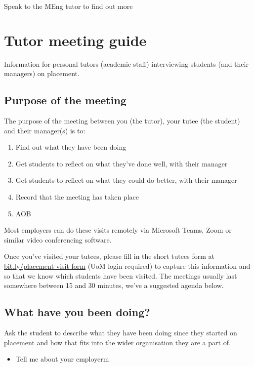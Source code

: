 \documentclass[
]{book}
\providecommand{\tightlist}{%
  \setlength{\itemsep}{0pt}\setlength{\parskip}{0pt}}
\begin{document}
Speak to the MEng tutor to find out more

\chapter{Tutor meeting guide}\label{tutors}

Information for personal tutors (academic staff) interviewing students (and their managers) on placement.

\section{Purpose of the meeting}\label{purpose}

The purpose of the meeting between you (the tutor), your tutee (the student) and their manager(s) is to:

\begin{enumerate}
\def\labelenumi{\arabic{enumi}.}
\tightlist
\item
  Find out what they have been doing\\
\item
  Get students to reflect on what they've done well, with their manager
\item
  Get students to reflect on what they could do better, with their manager
\item
  Record that the meeting has taken place
\item
  AOB
\end{enumerate}

Most employers can do these visits remotely via Microsoft Teams, Zoom or similar video conferencing software.

Once you've visited your tutees, please fill in the short tutees form at \url{bit.ly/placement-visit-form} (UoM login required) to capture this information and so that we know which students have been visited. The meetings usually last somewhere between 15 and 30 minutes, we've a suggested agenda below.

\section{What have you been doing?}\label{what}

Ask the student to describe what they have been doing since they started on placement and how that fits into the wider organisation they are a part of.

\begin{itemize}
\tightlist
\item
  Tell me about your employerm
\end{itemize}
\end{document}
